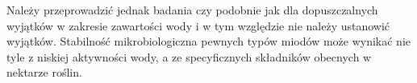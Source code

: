 Należy przeprowadzić jednak badania czy podobnie jak dla dopuszczalnych wyjątków w zakresie zawartości wody i w tym względzie nie należy ustanowić wyjątków. Stabilność mikrobiologiczna pewnych typów miodów może wynikać nie tyle z niskiej aktywności wody, a ze specyficznych składników obecnych w nektarze roślin. 





